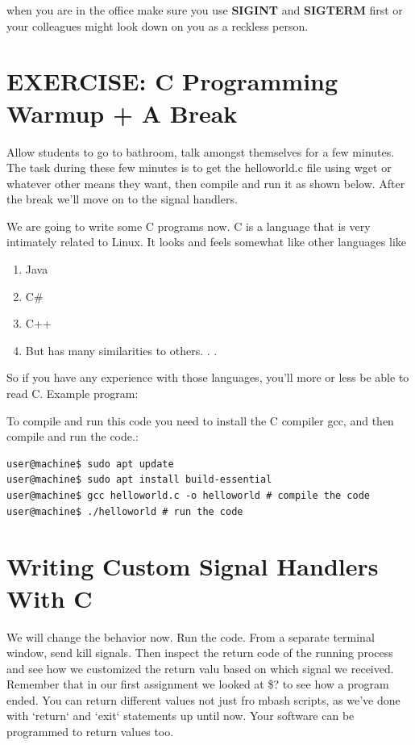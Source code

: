 \documentclass[12pt]{article}
\begin{document}
when you are in the office make sure you use \textbf{SIGINT} and \textbf{SIGTERM} first or your colleagues might look down on you as a reckless person.

\section{{\color{red} EXERCISE: C Programming Warmup + A Break}}
{\color{green} Allow students to go to bathroom, talk amongst themselves for a
few minutes. The task during these few minutes is to get the helloworld.c file
using wget or whatever other means they want, then compile and run it as shown
below. After the break we'll move on to the signal handlers}.

We are going to write some C programs now. C is a language that is very intimately related to Linux. It looks and feels somewhat like other languages like 
\begin{enumerate}
\item Java
\item C\#
\item C++
\item But has many similarities to others. . .
\end{enumerate}

So if you have any experience with those languages, you'll more or less be able to read C.
Example program:



To compile and run this code you need to install the C compiler gcc, and then
compile and run the code.:

\begin{lstlisting}
user@machine$ sudo apt update
user@machine$ sudo apt install build-essential
user@machine$ gcc helloworld.c -o helloworld # compile the code
user@machine$ ./helloworld # run the code
\end{lstlisting}

\section{Writing Custom Signal Handlers With C}

We will change the behavior now. Run the code. From a separate terminal window, send kill signals. Then inspect the return code of the running process and see how we customized the return valu based on which signal we received. Remember that in our first assignment we looked at \$? to see how a program ended. You can return different values not just fro mbash scripts, as we've done with `return` and `exit` statements up until now. Your software can be programmed to return values too.
\end{document}

